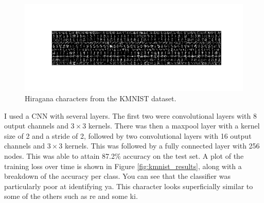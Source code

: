 \documentclass[11pt]{article}
\begin{document}
\begin{figure}
    \centering
    \includegraphics[width=\linewidth]{image_grid}
    \caption{Hiragana characters from the KMNIST dataset.}
    \label{fig:kmnist}
\end{figure}

I used a CNN with several layers. The first two were convolutional layers with 8 output channels and $3\times 3$ kernels.
 There was then a maxpool layer with a kernel size of 2 and a stride of 2, followed by two convolutional layers with 16 
output channels and $3 \times 3$ kernels. This was followed by a fully connected layer with 256 nodes. This was able
to attain 87.2\% accuracy on the test set. A plot of the training loss over time is shown in Figure \ref{fig:kmnist_results}, along with
 a breakdown of the accuracy per class. You can see that the classifier was particularly poor at identifying ya. This
 character looks superficially similar to some of the others such as re and some ki.
\end{document}
